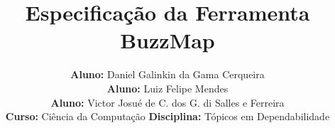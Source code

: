 \documentclass[a4paper, 12pt]{article}
\title{Especificação da Ferramenta BuzzMap}
\author{\textbf{Aluno:} Daniel Galinkin da Gama Cerqueira \\
        \textbf{Aluno:} Luiz Felipe Mendes \\ 
        \textbf{Aluno:} Victor Josué de C. dos G. di Salles e Ferreira \\ 
        \textbf{Curso:} Ciência da Computação
        \textbf{Disciplina:} Tópicos em Dependabilidade   
       }
\begin{document}
\begin{titlepage}
\maketitle
\thispagestyle{empty}
\end{titlepage}
\pagebreak










\nocite{wiki:UML, wiki:AD, wiki:UC, ian}


\end{document}
